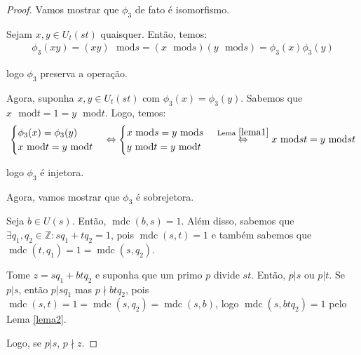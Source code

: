 \documentclass[a4paper,portuguese,11pt,twoside, leqno]{book}
\DeclareMathOperator{\mdc}{mdc}
\theoremstyle{definition}
\begin{document}
\begin{proof}
		
		\vspace{0.3cm}\par Vamos mostrar que $\phi_3$ de fato é isomorfismo.
		\par\vspace{0.3cm} Sejam $x,y\in U_t(st)$ quaisquer. Então, temos:
		\begin{align*}
		\phi_3(xy) = (xy)\text{ }\mathrm{mod} s = (x\text{ }\mathrm{mod} s)(y\text{ }\mathrm{mod} s) = \phi_3(x)\phi_3(y)
		\end{align*}
		\par\vspace{0.3cm}logo $\phi_3$ preserva a operação.
		\par\vspace{0.3cm} Agora, suponha $x,y\in U_t(st)$ com $\phi_3(x) = \phi_3(y)$. Sabemos que $x\text{ }\mathrm{mod} t = 1 = y\text{ }\mathrm{mod} t$. Logo, temos:
		\begin{align*}
		\begin{cases}
		\phi_3(x) = \phi_3(y) \\
		x\text{ }\mathrm{mod} t = y\text{ }\mathrm{mod} t
		\end{cases}\Leftrightarrow
		\begin{cases}
		x\text{ }\mathrm{mod} s = y\text{ }\mathrm{mod} s \\
		y\text{ }\mathrm{mod} t = y\text{ }\mathrm{mod} t
		\end{cases} \overset{\text{Lema } \eqref{lema1}}{\Leftrightarrow } x\text{ }\mathrm{mod} {st} = y\text{ }\mathrm{mod} {st} 
		\end{align*}
		\par\vspace{0.3cm}logo $\phi_3$ é injetora. 
		\par\vspace{0.3cm} Agora, vamos mostrar que $\phi_3$ é sobrejetora.
		\par\vspace{0.3cm} Seja $b\in U(s)$. Então, $\mdc(b,s) = 1$. Além disso, sabemos que $\exists q_1, q_2\in\mathbb{Z}: sq_1 + tq_2 = 1$, pois $\mdc(s,t) = 1$ e também sabemos que $\mdc(t,q_1) = 1 = \mdc(s, q_2)$. 
		\par\vspace{0.3cm} Tome $z = sq_1 + btq_2$ e suponha que um primo $p$ divide $st$. Então, $p|s$ ou $p|t$. Se $p|s$, então $p|sq_1$ mas $p\nmid btq_2$, pois $\mdc(s,t) = 1 = \mdc(s,q_2) = \mdc(s,b)$, logo $\mdc(s, btq_2) = 1$ pelo Lema \eqref{lema2}. 
		\par\vspace{0.3cm} Logo, se $p|s$, $p\nmid z$.

\end{proof}
\end{document}
